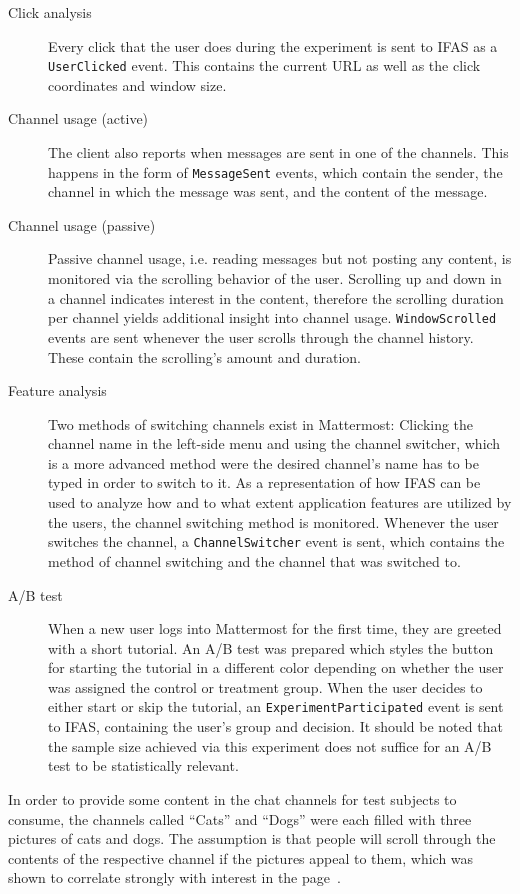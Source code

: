 \begin{description}
\item[Click analysis]
Every click that the user does during the experiment is sent to \ac{IFAS} as a \texttt{UserClicked} event.
This contains the current URL as well as the click coordinates and window size.
\item[Channel usage (active)]
The client also reports when messages are sent in one of the channels.
This happens in the form of \texttt{MessageSent} events, which contain the sender, the channel in which the message was sent, and the content of the message.
\item[Channel usage (passive)]
Passive channel usage, i.e. reading messages but not posting any content, is monitored via the scrolling behavior of the user.
Scrolling up and down in a channel indicates interest in the content, therefore the scrolling duration per channel yields additional insight into channel usage.
\texttt{WindowScrolled} events are sent whenever the user scrolls through the channel history.
These contain the scrolling's amount and duration.
\item[Feature analysis]
Two methods of switching channels exist in Mattermost: Clicking the channel name in the left-side menu and using the channel switcher, which is a more advanced method were the desired channel's name has to be typed in order to switch to it.
As a representation of how \ac{IFAS} can be used to analyze how and to what extent application features are utilized by the users, the channel switching method is monitored.
Whenever the user switches the channel, a \texttt{ChannelSwitcher} event is sent, which contains the method of channel switching and the channel that was switched to.
\item[A/B test]
When a new user logs into Mattermost for the first time, they are greeted with a short tutorial.
An A/B test was prepared which styles the button for starting the tutorial in a different color depending on whether the user was assigned the control or treatment group.
When the user decides to either start or skip the tutorial, an \texttt{ExperimentParticipated} event is sent to \ac{IFAS}, containing the user's group and decision.
It should be noted that the sample size achieved via this experiment does not suffice for an A/B test to be statistically relevant.

\end{description}

In order to provide some content in the chat channels for test subjects to consume, the channels called ``Cats'' and ``Dogs'' were each filled with three pictures of cats and dogs.
The assumption is that people will scroll through the contents of the respective channel if the pictures appeal to them, which was shown to correlate strongly with interest in the page~\cite{Claypool2001}.

